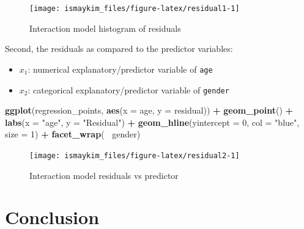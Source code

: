 \documentclass[12pt, krantz2,]{krantz}
\makeatletter
\newenvironment{Shaded}{\begin{snugshade}}{\end{snugshade}}
\newcommand{\DataTypeTok}[1]{\textcolor[rgb]{0.27,0.27,0.27}{#1}}
\newcommand{\DecValTok}[1]{\textcolor[rgb]{0.06,0.06,0.06}{#1}}
\newcommand{\KeywordTok}[1]{\textcolor[rgb]{0.27,0.27,0.27}{\textbf{#1}}}
\newcommand{\NormalTok}[1]{#1}
\newcommand{\OperatorTok}[1]{\textcolor[rgb]{0.43,0.43,0.43}{\textbf{#1}}}
\newcommand{\StringTok}[1]{\textcolor[rgb]{0.5,0.5,0.5}{#1}}
\providecommand{\tightlist}{%
  \setlength{\itemsep}{0pt}\setlength{\parskip}{0pt}}
\newenvironment{kframe}{%
\medskip{}
\setlength{\fboxsep}{.8em}
 \def\at@end@of@kframe{}%
 \ifinner\ifhmode%
  \def\at@end@of@kframe{\end{minipage}}%
  \begin{minipage}{\columnwidth}%
 \fi\fi%
 \def\FrameCommand##1{\hskip\@totalleftmargin \hskip-\fboxsep
 \colorbox{shadecolor}{##1}\hskip-\fboxsep
     \hskip-\linewidth \hskip-\@totalleftmargin \hskip\columnwidth}%
 \MakeFramed {\advance\hsize-\width
   \@totalleftmargin\z@ \linewidth\hsize
   \@setminipage}}%
 {\par\unskip\endMakeFramed%
 \at@end@of@kframe}
\renewenvironment{Shaded}{\begin{kframe}}{\end{kframe}}
\makeatother
\begin{document}
\begin{figure}

{\centering \texttt{[image: ismaykim\_files/figure-latex/residual1-1]} 

}

\caption{Interaction model histogram of residuals}\label{fig:residual1}
\end{figure}

Second, the residuals as compared to the predictor variables:

\begin{itemize}
\tightlist
\item
  \(x_1\): numerical explanatory/predictor variable of \texttt{age}
\item
  \(x_2\): categorical explanatory/predictor variable of \texttt{gender}
\end{itemize}

\begin{Shaded}
\begin{Highlighting}[]
\KeywordTok{ggplot}\NormalTok{(regression_points, }\KeywordTok{aes}\NormalTok{(}\DataTypeTok{x =}\NormalTok{ age, }\DataTypeTok{y =}\NormalTok{ residual)) }\OperatorTok{+}
\StringTok{  }\KeywordTok{geom_point}\NormalTok{() }\OperatorTok{+}
\StringTok{  }\KeywordTok{labs}\NormalTok{(}\DataTypeTok{x =} \StringTok{"age"}\NormalTok{, }\DataTypeTok{y =} \StringTok{"Residual"}\NormalTok{) }\OperatorTok{+}
\StringTok{  }\KeywordTok{geom_hline}\NormalTok{(}\DataTypeTok{yintercept =} \DecValTok{0}\NormalTok{, }\DataTypeTok{col =} \StringTok{"blue"}\NormalTok{, }\DataTypeTok{size =} \DecValTok{1}\NormalTok{) }\OperatorTok{+}
\StringTok{  }\KeywordTok{facet_wrap}\NormalTok{(}\OperatorTok{~}\StringTok{ }\NormalTok{gender)}
\end{Highlighting}
\end{Shaded}

\begin{figure}

{\centering \texttt{[image: ismaykim\_files/figure-latex/residual2-1]} 

}

\caption{Interaction model residuals vs predictor}\label{fig:residual2}
\end{figure}

\hypertarget{part-conclusion}{%
\part{Conclusion}\label{part-conclusion}}
\end{document}
